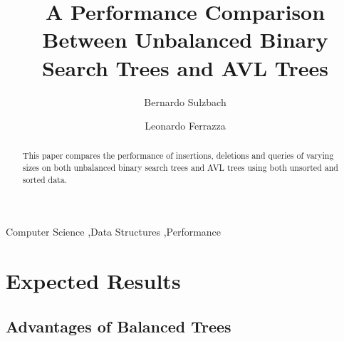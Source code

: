 \documentclass[12pt]{elsarticle}
\begin{document}
\begin{frontmatter}


    \title{A Performance Comparison Between Unbalanced Binary Search Trees and AVL Trees}




    \author{Bernardo Sulzbach}

    \author{Leonardo Ferrazza}

    \address{Rio Grande do Sul, Brazil}

    \begin{abstract}
    This paper compares the performance of insertions, deletions and queries of
    varying sizes on both unbalanced binary search trees and AVL trees using
    both unsorted and sorted data.
    \end{abstract}

    \begin{keyword}
        Computer Science \sep Data Structures \sep Performance
    \end{keyword}

\end{frontmatter}

\linenumbers

\section{Expected Results}


\subsection{Advantages of Balanced Trees}
\end{document}
